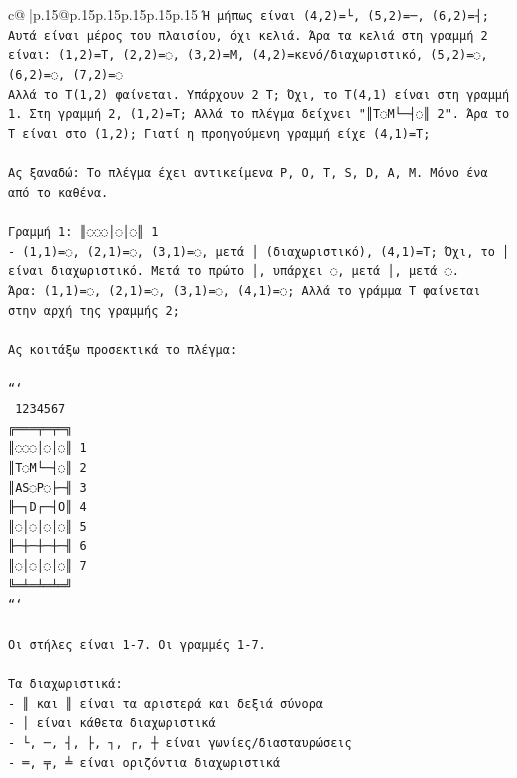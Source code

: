 \documentclass{article}
\begin{document}
{\begin{supertabular}{c@{$\;$}|p{.15\linewidth}@{}p{.15\linewidth}p{.15\linewidth}p{.15\linewidth}p{.15\linewidth}p{.15\linewidth}}
{{{\texttt{Ή μήπως είναι (4,2)=└, (5,2)=─, (6,2)=┤; Αυτά είναι μέρος του πλαισίου, όχι κελιά. Άρα τα κελιά στη γραμμή 2 είναι: (1,2)=T, (2,2)=◌, (3,2)=M, (4,2)=κενό/διαχωριστικό, (5,2)=◌, (6,2)=◌, (7,2)=◌} \\
\texttt{Αλλά το T(1,2) φαίνεται. Υπάρχουν 2 T; Όχι, το T(4,1) είναι στη γραμμή 1. Στη γραμμή 2, (1,2)=T; Αλλά το πλέγμα δείχνει "║T◌M└─┤◌║ 2". Άρα το T είναι στο (1,2); Γιατί η προηγούμενη γραμμή είχε (4,1)=T;} \\
\\ 
\texttt{Ας ξαναδώ: Το πλέγμα έχει αντικείμενα P, O, T, S, D, A, M. Μόνο ένα από το καθένα.} \\
\\ 
\texttt{Γραμμή 1: ║◌◌◌│◌│◌║ 1} \\
\texttt{{-} (1,1)=◌, (2,1)=◌, (3,1)=◌, μετά │ (διαχωριστικό), (4,1)=T; Όχι, το │ είναι διαχωριστικό. Μετά το πρώτο │, υπάρχει ◌, μετά │, μετά ◌.} \\
\texttt{Άρα: (1,1)=◌, (2,1)=◌, (3,1)=◌, (4,1)=◌; Αλλά το γράμμα T φαίνεται στην αρχή της γραμμής 2;} \\
\\ 
\texttt{Ας κοιτάξω προσεκτικά το πλέγμα:} \\
\\ 
\texttt{```} \\
\texttt{ 1234567} \\
\texttt{╔═══╤═╤═╗} \\
\texttt{║◌◌◌│◌│◌║ 1} \\
\texttt{║T◌M└─┤◌║ 2} \\
\texttt{║AS◌P◌├─╢ 3} \\
\texttt{╟─┐D┌─┤O║ 4} \\
\texttt{║◌│◌│◌│◌║ 5} \\
\texttt{╟─┼─┼─┼─╢ 6} \\
\texttt{║◌│◌│◌│◌║ 7} \\
\texttt{╚═╧═╧═╧═╝} \\
\texttt{```} \\
\\ 
\texttt{Οι στήλες είναι 1{-}7. Οι γραμμές 1{-}7.} \\
\\ 
\texttt{Τα διαχωριστικά:} \\
\texttt{{-} ║ και ║ είναι τα αριστερά και δεξιά σύνορα} \\
\texttt{{-} │ είναι κάθετα διαχωριστικά} \\
\texttt{{-} └, ─, ┤, ├, ┐, ┌, ┼ είναι γωνίες/διασταυρώσεις} \\
\texttt{{-} ═, ╤, ╧ είναι οριζόντια διαχωριστικά} \\
}}}
\end{supertabular}}
\end{document}
